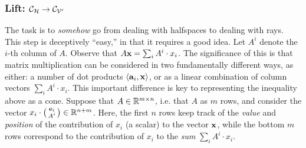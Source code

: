 \subsubsection{Lift: $\mathcal{C}_{\mathcal{H}} \to \mathcal{C}_{\mathcal{V'}}$}
The task is to \textit{somehow} go from dealing with halfspaces to dealing with rays.  This step is deceptively ``easy,'' in that it requires a good idea.  Let $A^i$ denote the $i$-th column of $A$.  Observe that $A\mathbf{x} = \sum_i A^i\cdot x_i$.  The significance of this is that matrix multiplication can be considered in two fundamentally different ways, as either: a number of dot products $\langle \mathbf{a}_i, \mathbf{x} \rangle$, or as a linear combination of column vectors $\sum_i A^i\cdot x_i$.  This important difference is key to representing the inequality above as a cone.  Suppose that $A \in \mathbb{R}^{m\times n}$, i.e. that $A$ as $m$ rows, and consider the vector $x_i\cdot\left(\begin{smallmatrix}\mathbf{e}_i \\ A^i\end{smallmatrix}\right) \in \mathbb{R}^{n + m}$.  Here, the first $n$ rows keep track of the \textit{value} and \textit{position} of the contribution of $x_i$ (a scalar) to the vector $\mathbf{x}$, while the bottom $m$ rows correspond to the contribution of $x_i$ to the \textit{sum} $\sum_i A^i\cdot x_i$.

